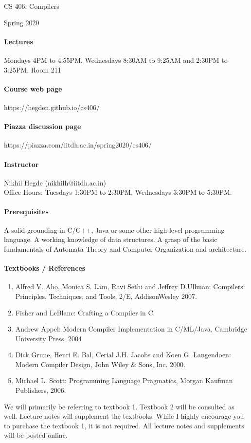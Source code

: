 \documentclass{article}
\begin{document}
\begin{center}{\LARGE CS 406: Compilers} \end{center}
\begin{center}{\large Spring 2020} \end{center}

\bigskip

\paragraph{Lectures}
Mondays 4PM to 4:55PM, Wednesdays 8:30AM to 9:25AM and 2:30PM to 3:25PM, Room 211
\paragraph{Course web page} https://hegden.github.io/cs406/
\paragraph{Piazza discussion page} https://piazza.com/iitdh.ac.in/spring2020/cs406/

\paragraph{Instructor}
Nikhil Hegde (nikhilh@iitdh.ac.in) \\
Office Hours: Tuesdays 1:30PM to 2:30PM, Wednesdays 3:30PM to 5:30PM.  

\paragraph{Prerequisites}  A solid grounding in C/C++, Java or some other high level programming language. 
A working knowledge of data structures. 
A grasp of the basic fundamentals of Automata Theory and Computer Organization and architecture. 

\paragraph{Textbooks / References} 
\begin{enumerate}
	\item Alfred V. Aho, Monica S. Lam, Ravi Sethi and Jeffrey D.Ullman: Compilers: Principles, Techniques, and Tools, 2/E, AddisonWesley 2007.
	\item Fisher and LeBlanc: Crafting a Compiler in C. 
	\item Andrew Appel: Modern Compiler Implementation in C/ML/Java, Cambridge University Press, 2004
	\item Dick Grune, Henri E. Bal, Cerial J.H. Jacobs and Koen G. Langendoen: Modern Compiler Design, John Wiley \& Sons, Inc. 2000.
	\item Michael L. Scott: Programming Language Pragmatics, Morgan Kaufman Publishers, 2006.
\end{enumerate}
We will primarily be referring to textbook 1. Textbook 2 will be consulted as well. Lecture notes will supplement the textbooks. 
While I highly encourage you to purchase the textbook 1, it is not required.
All lecture notes and supplements will be posted online.  
\end{document}
